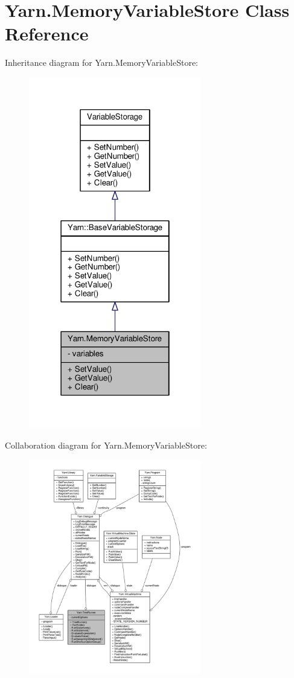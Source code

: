 \hypertarget{a00052}{\section{Yarn.\-Memory\-Variable\-Store Class Reference}
\label{a00052}
}


Inheritance diagram for Yarn.\-Memory\-Variable\-Store\-:
\nopagebreak
\begin{figure}[H]
\begin{center}
\leavevmode
\includegraphics[width=214pt]{db/da2/a00300}
\end{center}
\end{figure}


Collaboration diagram for Yarn.\-Memory\-Variable\-Store\-:
\nopagebreak
\begin{figure}[H]
\begin{center}
\leavevmode
\includegraphics[width=214pt]{da/d50/a00301}
\end{center}
\end{figure}
